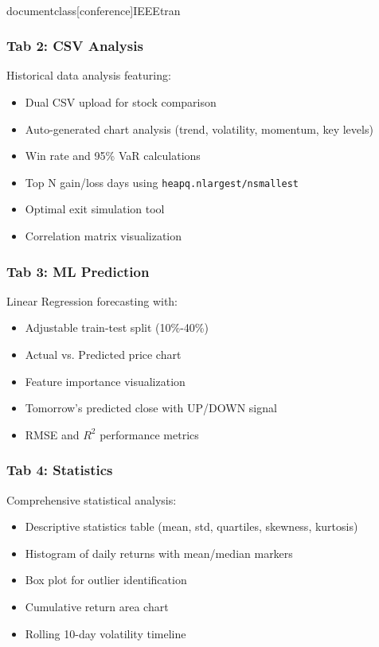 \\documentclass[conference]{IEEEtran}
\begin{document}
\subsubsection{Tab 2: CSV Analysis}
Historical data analysis featuring:
\begin{itemize}
    \item Dual CSV upload for stock comparison
    \item Auto-generated chart analysis (trend, volatility, momentum, key levels)
    \item Win rate and 95\% VaR calculations
    \item Top N gain/loss days using \texttt{heapq.nlargest/nsmallest}
    \item Optimal exit simulation tool
    \item Correlation matrix visualization
\end{itemize}

\subsubsection{Tab 3: ML Prediction}
Linear Regression forecasting with:
\begin{itemize}
    \item Adjustable train-test split (10\%-40\%)
    \item Actual vs. Predicted price chart
    \item Feature importance visualization
    \item Tomorrow's predicted close with UP/DOWN signal
    \item RMSE and $R^2$ performance metrics
\end{itemize}

\subsubsection{Tab 4: Statistics}
Comprehensive statistical analysis:
\begin{itemize}
    \item Descriptive statistics table (mean, std, quartiles, skewness, kurtosis)
    \item Histogram of daily returns with mean/median markers
    \item Box plot for outlier identification
    \item Cumulative return area chart
    \item Rolling 10-day volatility timeline
\end{itemize}
\end{document}
